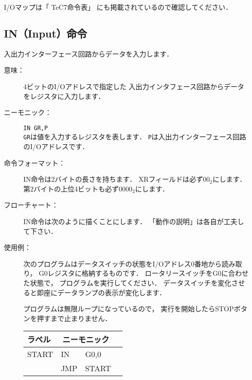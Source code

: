 I/Oマップは「 TeC7命令表」
にも掲載されているので確認してください．

\subsection{IN（Input）命令}

入出力インターフェース回路からデータを入力します．

\begin{description}
\item[意味：]4ビットのI/Oアドレスで指定した
入出力インタフェース回路からデータをレジスタに入力します．

\item[ニーモニック：]{\tt IN  GR,P} \\
{\tt GR}は値を入力するレジスタを表します．
{\tt P}は入出力インターフェース回路のI/Oアドレスです．

\item[命令フォーマット：]IN命令は2バイトの長さを持ちます．
XRフィールドは必ず$00_2$にします．
第2バイトの上位4ビットも必ず$0000_2$にします．


\item[フローチャート：]IN命令は次のように描くことにします．
「動作の説明」は各自が工夫して下さい．

\begin{center}
\end{center}

\item[使用例：]
次のプログラムはデータスイッチの状態をI/Oアドレス0番地から読み取り，
G0レジスタに格納するものです．
ロータリースイッチをG0に合わせた状態で，
プログラムを実行してください．
データスイッチを変化させると即座にデータランプの表示が変化します．

プログラムは無限ループになっているので，
実行を開始したらSTOPボタンを押すまで止まりません．

{\tt\small\begin{center}
\begin{tabular}{|l|l l|l}
\cline{1-3}
ラベル & \multicolumn{2}{|c|}{ニーモニック} \\
\hline
START & IN   & G0,0    \\
      & JMP  & START   \\ 
\hline
\end{tabular}
\end{center}}


\end{description}

